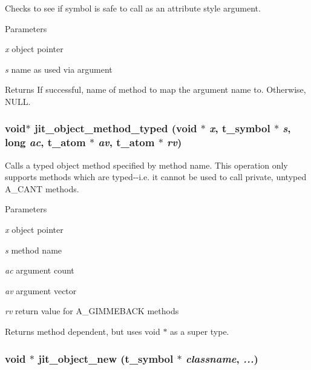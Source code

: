 Checks to see if symbol is safe to call as an attribute style argument. 
\begin{DoxyParams}{Parameters}
\item[{\em x}]object pointer \item[{\em s}]name as used via argument\end{DoxyParams}
\begin{DoxyReturn}{Returns}
If successful, name of method to map the argument name to. Otherwise, NULL. 
\end{DoxyReturn}
\hypertarget{group__objectmod_ga9c9b8591a887cddd19b313c8e995fbea}{
\subsubsection[{jit\_\-object\_\-method\_\-typed}]{\setlength{\rightskip}{0pt plus 5cm}void$\ast$ jit\_\-object\_\-method\_\-typed (void $\ast$ {\em x}, \/  {\bf t\_\-symbol} $\ast$ {\em s}, \/  long {\em ac}, \/  {\bf t\_\-atom} $\ast$ {\em av}, \/  {\bf t\_\-atom} $\ast$ {\em rv})}}
\label{group__objectmod_ga9c9b8591a887cddd19b313c8e995fbea}


Calls a typed object method specified by method name. This operation only supports methods which are typed-\/-\/i.e. it cannot be used to call private, untyped A\_\-CANT methods.


\begin{DoxyParams}{Parameters}
\item[{\em x}]object pointer \item[{\em s}]method name \item[{\em ac}]argument count \item[{\em av}]argument vector \item[{\em rv}]return value for A\_\-GIMMEBACK methods\end{DoxyParams}
\begin{DoxyReturn}{Returns}
method dependent, but uses void $\ast$ as a super type. 
\end{DoxyReturn}
\hypertarget{group__objectmod_gabde2eb49750992ec4125af862b402342}{
\subsubsection[{jit\_\-object\_\-new}]{\setlength{\rightskip}{0pt plus 5cm}void $\ast$ jit\_\-object\_\-new ({\bf t\_\-symbol} $\ast$ {\em classname}, \/   {\em ...})}}
\label{group__objectmod_gabde2eb49750992ec4125af862b402342}


